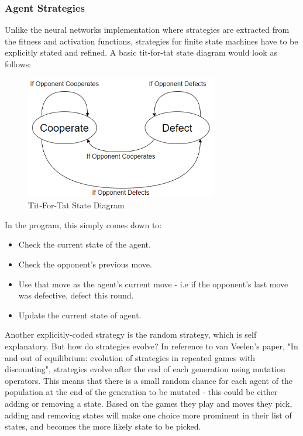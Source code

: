 \documentclass[12pt,a4paper]{article}
\begin{document}
\subsubsection{Agent Strategies}
Unlike the neural networks implementation where strategies are extracted from the fitness and activation functions, strategies for finite state machines have to be explicitly stated and refined. A basic tit-for-tat state diagram would look as follows:

\begin{figure}[H]
	\centering
		\includegraphics[width=0.75\textwidth]{TitForTatStates}
		\caption{Tit-For-Tat State Diagram}
\end{figure}

In the program, this simply comes down to:

\begin{itemize}
  \item Check the current state of the agent.
  \item Check the opponent's previous move.
  \item Use that move as the agent's current move - i.e if the opponent's last move was defective, defect this round.
  \item Update the current state of agent.
\end{itemize}

Another explicitly-coded strategy is the random strategy, which is self explanatory. But how do strategies evolve? In reference to van Veelen's paper, "In and out of equilibrium: evolution of strategies in repeated games with discounting"\cite{46}, strategies evolve after the end of each generation using mutation operators. This means that there is a small random chance for each agent of the population at the end of the generation to be mutated - this could be either adding or removing a state. Based on the games they play and moves they pick, adding and removing states will make one choice more prominent in their list of states, and becomes the more likely state to be picked.
\end{document}
